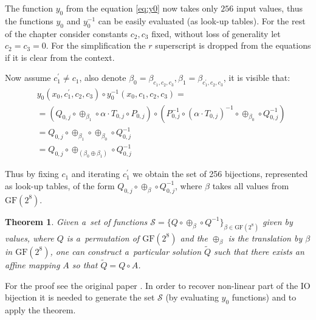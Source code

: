 \documentclass[11pt,oneside,final]{fithesis2}
\newtheorem{mytheorem}{Theorem}
\newcommand{\gfe}{\ensuremath{\text{GF}\left(2^8\right)}}
\begin{document}
    The function $y_0$ from the equation \ref{eq:y0} now takes only $256$ input values, thus the functions $y_0$ and $y_0^{-1}$ 
    can be easily evaluated (as look-up tables). For the rest of the chapter consider constants $c_2, c_3$ fixed, without loss 
    of generality let $c_2=c_3=0$. For the simplification the $r$ superscript is dropped from the 
    equations if it is clear from the context.

    Now assume $c^{\prime}_1 \neq c_1$, also denote $\beta_{0} = \beta_{c_1,c_2,c_3}, \beta_{1} = \beta_{c^{\prime}_1,c_2,c_3}$, it is visible that:
    \begin{subequations}
     \begin{align}
     & y_0\left(x_0, c^{\prime}_1, c_2, c_3 \right) \circ y_0^{-1}\left(x_0, c_1, c_2, c_3 \right) = \nonumber \\
     &=           \left( Q_{0,j}      \circ \oplus_{\beta_1}                         \circ \alpha \cdot T_{0,j}    \circ P_{0,j}     \right) \nonumber
	\circ     \left( P^{-1}_{0,j} \circ \left(\alpha \cdot T_{0,j}\right)^{-1}   \circ \oplus_{\beta_0}        \circ Q^{-1}_{0,j}\right) \nonumber \\
     &= Q_{0,j} \circ \oplus_{\beta_1} \circ \oplus_{\beta_0} \circ Q^{-1}_{0,j}                                                             \nonumber \\
     &= Q_{0,j} \circ \oplus_{\left(\beta_0 \oplus \beta_1\right)} \circ Q^{-1}_{0,j}                                                        \nonumber
     \end{align}
    \end{subequations}

    Thus by fixing $c_1$ and iterating $c^{\prime}_1$ we obtain the set of 256 bijections, represented as look-up tables, 
    of the form $Q_{0,j} \circ \oplus_{\beta} \circ Q^{-1}_{0,j}$, where $\beta$ takes all values from $\gfe$.
    
    \begin{mytheorem}\label{prop:bge1}
     Given a~set of functions $\mathcal{S} = \{Q \circ \oplus_{\beta} \circ Q^{-1}\}_{\beta \in \gfe}$ given by values, 
     where $Q$ is a~permutation of $\gfe$ and the $\oplus_{\beta}$ is the translation by $\beta$ in $\gfe$, one can construct a~particular
     solution $\widetilde{Q}$ such that there exists an affine mapping $A$ so that $\widetilde{Q} = Q \circ A$.
    \end{mytheorem}
    
    For the proof see the original paper \citep{Billet:2004:CWB:2080787.2080809}. In order to recover non-linear part of the IO bijection it is needed to generate
    the set $\mathcal{S}$ (by evaluating $y_0$ functions) and to apply the theorem.
    
\end{document}

